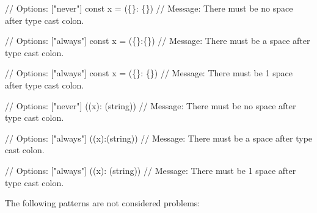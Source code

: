 \begin{DoxyCode}
// Options: ["never"]
const x = (\{\}: \{\})
// Message: There must be no space after type cast colon.

// Options: ["always"]
const x = (\{\}:\{\})
// Message: There must be a space after type cast colon.

// Options: ["always"]
const x = (\{\}:  \{\})
// Message: There must be 1 space after type cast colon.

// Options: ["never"]
((x): (string))
// Message: There must be no space after type cast colon.

// Options: ["always"]
((x):(string))
// Message: There must be a space after type cast colon.

// Options: ["always"]
((x):  (string))
// Message: There must be 1 space after type cast colon.
\end{DoxyCode}


The following patterns are not considered problems\+:


